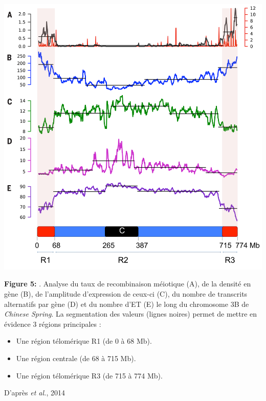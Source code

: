 \documentclass[a4paper, 12pt]{article}
\begin{document}
\begin{onehalfspace}
\newpage
\thispagestyle{empty}
\begin{center}
~ \vfill
\includegraphics[scale=0.25]{pic_Data/fig_choulet.png}\\
\end{center}
\textbf{Figure 5:} . Analyse du taux de recombinaison méiotique (A), de la densité en gène (B), de l'amplitude d'expression de ceux-ci (C), du nombre de transcrits alternatifs par gène (D) et du nombre d'ET (E) le long du chromosome 3B de \textit{Chinese Spring}. La segmentation des valeurs (lignes noires) permet de mettre en évidence 3 régions principales :
\begin{itemize}
\item Une région télomérique R1 (de 0 à 68 Mb).
\item Une région centrale (de 68 à 715 Mb).
\item Une région télomérique R3 (de 715 à 774 Mb).
\end{itemize}
\begin{flushright}
D'après  \textit{et al.}, 2014\\
\end{flushright}
\vfill
\addtocounter{page}{-1}
\newpage


\end{onehalfspace}
\end{document}
